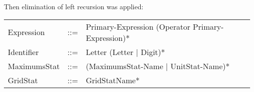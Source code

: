 		Then elimination of left recursion was applied: \\
		\begin{center}
			\begin{tabular}{ l l l }
				Expression 		   &	::=	 & Primary-Expression (Operator Primary-Expression)* \\		
				Identifier 		   &    ::=  & Letter (Letter $\mid$ Digit)* \\
				MaximumsStat	   &	::=  & (MaximumsStat-Name $\mid$ UnitStat-Name)* \\
				GridStat		   &	::=  & GridStatName*  		\\
			\end{tabular}
		\end{center}   